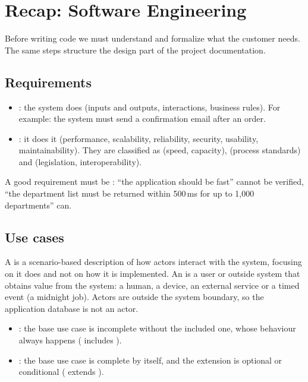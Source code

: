 \section{Recap: Software Engineering}\label{sec:se}

Before writing code we must understand and formalize what the customer needs. The same steps structure the design part of the project documentation.

\subsection{Requirements}
\begin{itemize}
  \item {}:  the system does (inputs and outputs, interactions, business rules). For example: the system must send a confirmation email after an order.
  \item {}:  it does it (performance, scalability, reliability, security, usability, maintainability). They are classified as  (speed, capacity),  (process standards) and  (legislation, interoperability).
\end{itemize}
A good requirement must be : ``the application should be fast'' cannot be verified, ``the department list must be returned within 500\,ms for up to 1{,}000 departments'' can.

\subsection{Use cases}
A  is a scenario-based description of how actors interact with the system, focusing on  it does and not on how it is implemented. An  is a user or outside system that obtains value from the system: a human, a device, an external service or a timed event (a midnight job). Actors are outside the system boundary, so the application database is not an actor.
\begin{itemize}
  \item {}: the base use case is incomplete without the included one, whose behaviour always happens ( includes ).
  \item {}: the base use case is complete by itself, and the extension is optional or conditional ( extends ).
\end{itemize}

